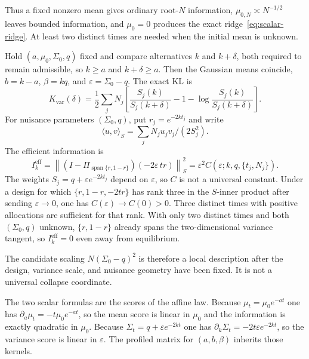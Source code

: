 \documentclass[anon,11pt]{alt2027}
\begin{document}
Thus a fixed nonzero mean gives ordinary root-$N$ information,
$\mu_{0,N}\asymp N^{-1/2}$ leaves bounded information, and $\mu_0=0$
produces the exact ridge~\eqref{eq:scalar-ridge}. At least two distinct times
are needed when the initial mean is unknown.

\begin{proposition}
\label{prop:weak-var}
Hold $(a,\mu_0,\Sigma_0,q)$ fixed and compare alternatives $k$ and $k+\delta$,
both required to remain admissible, so $k\ge a$ and $k+\delta\ge a$. Then the
Gaussian means coincide, $b=k-a$, $\beta=kq$, and $\varepsilon=\Sigma_0-q$. The
exact KL is
\begin{equation}
\label{eq:var-kl}
K_{\mathrm{var}}(\delta)
=\frac12\sum_jN_j
\left[
\frac{S_j(k)}{S_j(k+\delta)}
-1-\log\frac{S_j(k)}{S_j(k+\delta)}
\right].
\end{equation}
For nuisance parameters $(\Sigma_0,q)$, put $r_j=e^{-2kt_j}$ and write
\[
\langle u,v\rangle_S=\sum_j N_j u_j v_j/(2S_j^2).
\]
The efficient information is
\begin{equation}
\label{eq:var-info}
I_k^{\mathrm{eff}}
=\left\|
(I-\Pi_{\operatorname{span}\{r,1-r\}})
(-2\varepsilon\,tr)
\right\|_S^2
=
\varepsilon^2 C(\varepsilon;k,q,\{t_j,N_j\}).
\end{equation}
The weights $S_j=q+\varepsilon e^{-2kt_j}$ depend on $\varepsilon$, so $C$ is not a
universal constant. Under a design for which
$\{r,1-r,-2tr\}$ has rank three in the $S$-inner product after sending
$\varepsilon\to 0$, one has $C(\varepsilon)\to C(0)>0$. Three distinct times with
positive allocations are sufficient for that rank. With only two distinct
times and both $(\Sigma_0,q)$ unknown, $\{r,1-r\}$ already spans the
two-dimensional variance tangent, so $I_k^{\mathrm{eff}}=0$ even away from
equilibrium.
\end{proposition}

The candidate scaling $N(\Sigma_0-q)^2$ is therefore a local description after
the design, variance scale, and nuisance geometry have been fixed. It is not a
universal collapse coordinate.

The two scalar formulas are the scores of the affine law. Because
$\mu_t=\mu_0 e^{-at}$ one has $\partial_a\mu_t=-t\mu_0 e^{-at}$, so the mean
score is linear in $\mu_0$ and the information is exactly quadratic in
$\mu_0$. Because $\Sigma_t=q+\varepsilon e^{-2kt}$ one has
$\partial_k\Sigma_t=-2t\varepsilon e^{-2kt}$, so the variance score is linear
in $\varepsilon$. The profiled matrix for $(a,b,\beta)$ inherits those
kernels.
\end{document}
